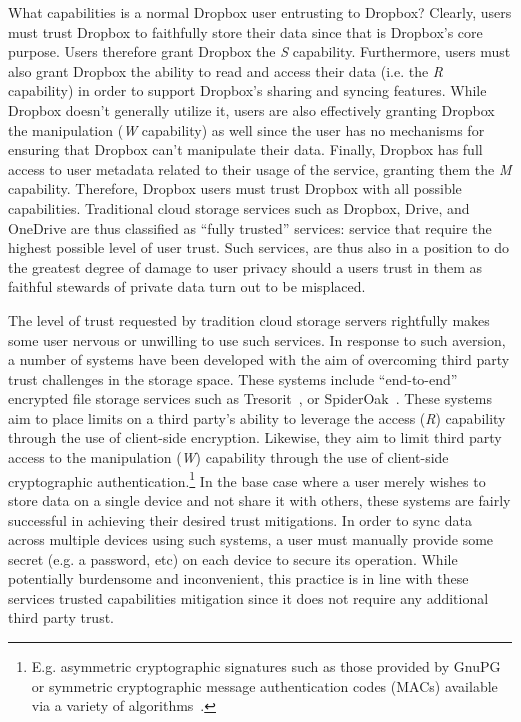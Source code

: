 What capabilities is a normal Dropbox user entrusting to Dropbox?
Clearly, users must trust Dropbox to faithfully store their data since
that is Dropbox's core purpose. Users therefore grant Dropbox the
\emph{S} capability. Furthermore, users must also grant Dropbox the
ability to read and access their data (i.e. the \emph{R} capability)
in order to support Dropbox's sharing and syncing features. While
Dropbox doesn't generally utilize it, users are also effectively
granting Dropbox the manipulation (\emph{W} capability) as well since
the user has no mechanisms for ensuring that Dropbox can't manipulate
their data. Finally, Dropbox has full access to user metadata related
to their usage of the service, granting them the \emph{M}
capability. Therefore, Dropbox users must trust Dropbox with all
possible capabilities. Traditional cloud storage services such as
Dropbox, Drive, and OneDrive are thus classified as ``fully trusted''
services: service that require the highest possible level of user
trust. Such services, are thus also in a position to do the greatest
degree of damage to user privacy should a users trust in them as
faithful stewards of private data turn out to be misplaced.

The level of trust requested by tradition cloud storage servers
rightfully makes some user nervous or unwilling to use such
services. In response to such aversion, a number of systems have been
developed with the aim of overcoming third party trust challenges in
the storage space. These systems include ``end-to-end'' encrypted file
storage services such as Tresorit~\cite{tresorit}, or
SpiderOak~\cite{spideroak}. These systems aim to place limits on a
third party's ability to leverage the access (\emph{R}) capability
through the use of client-side encryption. Likewise, they aim to limit
third party access to the manipulation (\emph{W}) capability through
the use of client-side cryptographic
authentication.\footnote{E.g. asymmetric cryptographic signatures such
  as those provided by GnuPG~\cite{gnupg} or symmetric cryptographic
  message authentication codes (MACs) available via a variety of
  algorithms~\cite{dworkin2005, dworkin2007, dworkin2008}.}  In the
base case where a user merely wishes to store data on a single device
and not share it with others, these systems are fairly successful in
achieving their desired trust mitigations. In order to sync data
across multiple devices using such systems, a user must manually
provide some secret (e.g. a password, etc) on each device to secure
its operation. While potentially burdensome and inconvenient, this
practice is in line with these services trusted capabilities
mitigation since it does not require any additional third party trust.

